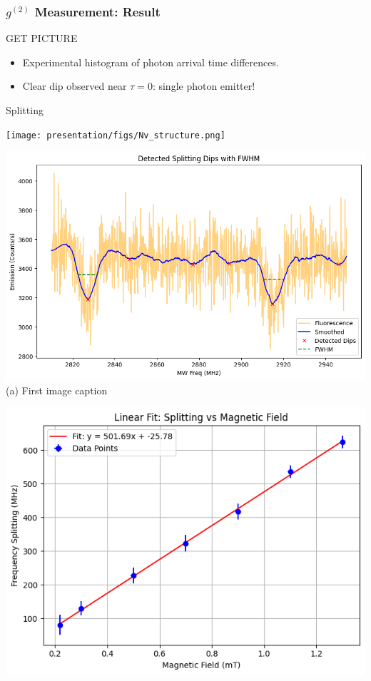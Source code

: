 \begin{frame}
\frametitle{$g^{(2)}$ Measurement: Result}
GET PICTURE
\begin{itemize}
    \item Experimental histogram of photon arrival time differences.
    \item Clear dip observed near $\tau = 0$: single photon emitter!
\end{itemize}
\end{frame}
\begin{frame}{Splitting}
    \begin{minipage}{0.5\textwidth}
        \centering
        \texttt{[image: presentation/figs/Nv\_structure.png]} \\
        {\small }
    \end{minipage}
    \begin{minipage}{0.48\textwidth}
        \centering
        \includegraphics[width=\linewidth]{presentation/figs/dips.png}
        {\small(a) First image caption}
    \end{minipage}
    \hfill
    \begin{minipage}{0.48\textwidth}
        \centering
        \includegraphics[width=\linewidth]{presentation/figs/split_vs_field.png}

\end{minipage}
\end{frame}

